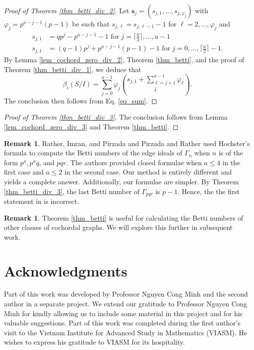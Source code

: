 \documentclass[12pt,amscd]{amsart}
\theoremstyle{definition}
\newtheorem{rem}[thm]{Remark}
\numberwithin{equation}{section}
\def\s {\mathbf s}
\begin{document}
\begin{proof}[Proof of Theorem \ref{thm_betti_div_2}] Let $\s_j = (s_{j,1}, \ldots, s_{j,\varphi_j})$ with $\varphi_j = p^{a-j-1}(p-1)$ be such that $s_{j,\ell} = s_{j,\ell-1} - 1$ for $\ell = 2, \ldots, \varphi_j$ and 
\begin{align*}
s_{j,1} &= qp^j - p^{a-j-1} - 1 \text{ for } j = \lceil \frac{a}{2} \rceil, \ldots, a-1\\
s_{j,1} & = (q-1)p^j + p^{a-j-1}(p-1) - 1 \text{ for } j = 0, \ldots, \lceil \frac{a}{2} \rceil - 1.
\end{align*}
By Lemma \ref{lem_cochord_zero_div_2}, Theorem \ref{thm_betti}, and the proof of Theorem \ref{thm_betti_div_1}, we deduce that
    $$\beta_i(S/I) = \sum_{j=0}^{a-1} \varphi_j \binom{s_{j,1} + \sum_{\ell = j+1}^{a-1} \varphi_\ell}{i}.$$
    The conclusion then follows from Eq. \eqref{eq_sum}.
\end{proof}

\begin{proof}[Proof of Theorem \ref{thm_betti_div_3}]
    The conclusion follows from Lemma \ref{lem_cochord_zero_div_3} and Theorem \ref{thm_betti}.
\end{proof}

\begin{rem} Rather, Imran, and Pirzada \cite{RIP} and Pirzada and Rather \cite{PR} used Hochster's formula \cite[Theorem 8.1.1]{HH} to compute the Betti numbers of the edge ideals of $\Gamma_n$ when $n$ is of the form $p^a, p^{a}q$, and $pqr$. The authors provided closed formulae when $a \le 4$ in the first case and $a \le 2$ in the second case. Our method is entirely different and yields a complete answer. Additionally, our formulae are simpler. By Theorem \ref{thm_betti_div_3}, the last Betti number of $\Gamma_{pqr}$ is $p-1$. Hence, the the first statement in \cite[Proposition 4.8]{RIP} is incorrect.    
\end{rem}

\begin{rem} Theorem \ref{thm_betti} is useful for calculating the Betti numbers of other classes of cochordal graphs. We will explore this further in subsequent work.    
\end{rem}
\section*{Acknowledgments} Part of this work was developed by Professor Nguyen Cong Minh and the second author in a separate project. We extend our gratitude to Professor Nguyen Cong Minh for kindly allowing us to include some material in this project and for his valuable suggestions. Part of this work was completed during the first author’s visit to the Vietnam Institute for Advanced Study in Mathematics (VIASM). He wishes to express his gratitude to VIASM for its hospitality.
\end{document}
